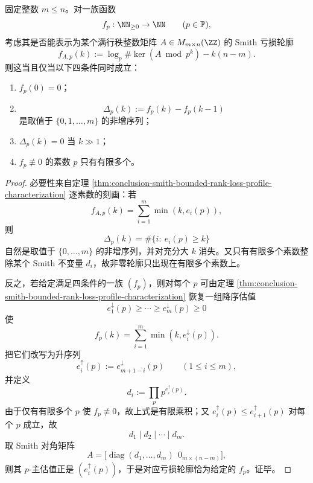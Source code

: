 

\begin{theorem}\label{thm:conclusion-smith-loss-profile-family-classification}
固定整数 \(m\le n\)。对一族函数
\[
f_p:\NN_{\ge 0}\to \NN
\qquad (p\in\mathbb P),
\]
考虑其是否能表示为某个满行秩整数矩阵 \(A\in M_{m\times n}(\ZZ)\) 的 Smith 亏损轮廓
\[
f_{A,p}(k):=\log_p\#\ker(A\bmod p^k)-k(n-m).
\]
则这当且仅当以下四条件同时成立：
\begin{enumerate}
  \item \(f_p(0)=0\)；
  \item
  \[
  \Delta_p(k):=f_p(k)-f_p(k-1)
  \]
  是取值于 \(\{0,1,\dots,m\}\) 的非增序列；
  \item \(\Delta_p(k)=0\) 当 \(k\gg 1\)；
  \item \(f_p\not\equiv 0\) 的素数 \(p\) 只有有限多个。
\end{enumerate}
\end{theorem}
\begin{proof}
必要性来自定理 \ref{thm:conclusion-smith-bounded-rank-loss-profile-characterization} 逐素数的刻画：若
\[
f_{A,p}(k)=\sum_{i=1}^m \min(k,e_i(p)),
\]
则
\[
\Delta_p(k)=\#\{i:\ e_i(p)\ge k\}
\]
自然是取值于 \(\{0,\dots,m\}\) 的非增序列，并对充分大 \(k\) 消失。又只有有限多个素数整除某个 Smith 不变量 \(d_i\)，故非零轮廓只出现在有限多个素数上。

反之，若给定满足四条件的一族 \((f_p)\)，则对每个 \(p\) 可由定理 \ref{thm:conclusion-smith-bounded-rank-loss-profile-characterization} 恢复一组降序估值
\[
e_1^\downarrow(p)\ge \cdots \ge e_m^\downarrow(p)\ge 0
\]
使
\[
f_p(k)=\sum_{i=1}^m \min(k,e_i^\downarrow(p)).
\]
把它们改写为升序列
\[
e_i^\uparrow(p):=e_{m+1-i}^\downarrow(p)
\qquad (1\le i\le m),
\]
并定义
\[
d_i:=\prod_p p^{e_i^\uparrow(p)}.
\]
由于仅有有限多个 \(p\) 使 \(f_p\not\equiv0\)，故上式是有限乘积；又 \(e_i^\uparrow(p)\le e_{i+1}^\uparrow(p)\) 对每个 \(p\) 成立，故
\[
d_1\mid d_2\mid \cdots \mid d_m.
\]
取 Smith 对角矩阵
\[
A=\bigl[\operatorname{diag}(d_1,\dots,d_m)\ \ 0_{m\times(n-m)}\bigr],
\]
则其 \(p\)-主估值正是 \((e_i^\uparrow(p))\)，于是对应亏损轮廓恰为给定的 \(f_p\)。证毕。
\end{proof}

